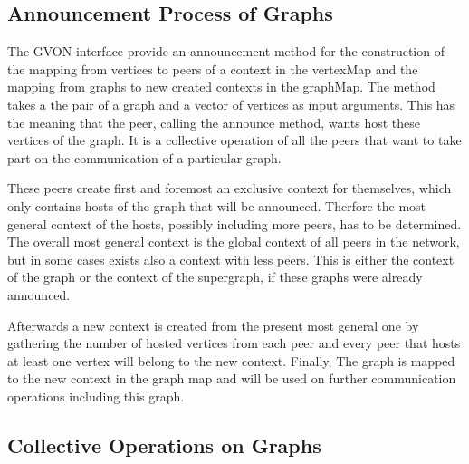 \subsection{Announcement Process of Graphs}
\label{sec:announcement_impl}

The GVON interface provide an announcement method for the construction
of the mapping from vertices to peers of a context in the vertexMap
and the mapping from graphs to new created contexts in the graphMap.
The method takes a the pair of a graph and a vector of vertices as
input arguments. This has the meaning that the peer, calling the
announce method, wants host these vertices of the graph.  It is a
collective operation of all the peers that want to take part on the
communication of a particular graph.

These peers create first and foremost an exclusive context for
themselves, which only contains hosts of the graph that will be
announced.  Therfore the most general context of the hosts, possibly
including more peers, has to be determined.  The overall most general
context is the global context of all peers in the network, but in some
cases exists also a context with less peers.  This is either the
context of the graph or the context of the supergraph, if these graphs
were already announced.

Afterwards a new context is created from the present most general one
by gathering the number of hosted vertices from each peer and every
peer that hosts at least one vertex will belong to the new context.
Finally, The graph is mapped to the new context in the graph map and
will be used on further communication operations including this graph.


\subsection{Collective Operations on Graphs}
\label{sec:gvon_collective}

